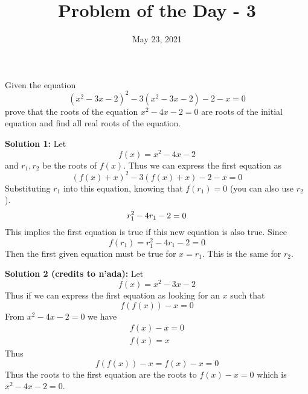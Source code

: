 \documentclass[answers]{exam}
\title{Problem of the Day - 3}
\date{May 23, 2021}
\begin{document}
	\begin{questions}
		\question
		Given the equation
		\begin{equation*}
			(x^2 - 3x -2)^2 -3(x^2 -3x - 2) - 2 - x = 0
		\end{equation*}
		prove that the roots of the equation $x^2 - 4x - 2 = 0$ are roots of the initial equation and find all real roots of the equation.
		
		\begin{solution}
			\textbf{Solution 1: } Let
			\begin{equation*}f(x) = x^2 - 4x - 2\end{equation*}
			and $r_1, r_2$ be the roots of $f(x)$. Thus we can express the first equation as
			\begin{equation*}
				(f(x) + x)^2 -3(f(x) + x) - 2 - x = 0
			\end{equation*}
			Substituting $r_1$ into this equation, knowing that $f(r_1) = 0$ (you can also use $r_2$).
			\begin{equation*}
				r_1^2 - 4r_1 - 2 = 0 \\
			\end{equation*}
			This implies the first equation is true if this new equation is also true. Since
			\begin{equation*}
				f(r_1) = r_1^2 - 4r_1 - 2 = 0
			\end{equation*}
			Then the first given equation must be true for $x = r_1$. This is the
      same for $r_2$. \par

      \textbf{Solution 2 (credits to n'ada):} Let
      \begin{equation*}
        f(x) = x^2 - 3x - 2
      \end{equation*}
      Thus if we can express the first equation as looking for an $x$ such that
      \begin{equation*}
        f(f(x)) - x = 0
      \end{equation*}
      From $x^2 - 4x - 2 = 0$ we have
      \begin{gather*}
        f(x) - x = 0 \\
        f(x) = x
      \end{gather*}
      Thus
      \begin{equation*}
        f(f(x)) - x = f(x) - x = 0
      \end{equation*}
      Thus the roots to the first equation are the roots to $f(x) - x = 0$
      which is $x^2 - 4x - 2 = 0$.
		\end{solution}
	\end{questions}
\end{document}
